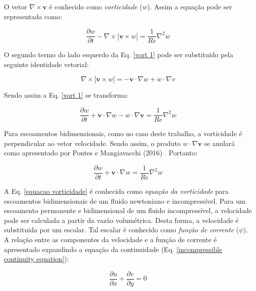 \medskip
O vetor $\nabla \times \textbf{v}$ é conhecido
como \textit{vorticidade} ($w$).
Assim a equação pode ser representada como:

\begin{equation} \label{vort 1}
 \frac{\partial w}{\partial t}
 - 
 \nabla \times \big[ \textbf{v} \times w \big]
 =
 \frac{1}{Re} \nabla^{2} w
\end{equation}

\medskip
O segundo termo do lado esquerdo da Eq. \ref{vort 1}
pode ser substituido pela seguinte identidade vetorial:


\begin{equation}
 \nabla \times \big[ \textbf{v} \times w \big]
 =
 -
 \textbf{v} \cdot \nabla w
 +
 w \cdot \nabla v
\end{equation}

\medskip
\noindent
Sendo assim a Eq. \ref{vort 1} se transforma:

\begin{equation} \label{vort 2}
 \frac{\partial w}{\partial t}
 +
 \textbf{v} \cdot \nabla w
 - 
 w \cdot \nabla \textbf{v}
 =
 \frac{1}{Re} \nabla^{2} w
\end{equation}

\medskip
Para escoamentos bidimensionais, como no caso deste trabalho, a vorticidade é perpendicular
ao vetor velocidade. Sendo assim, o produto $w \cdot \nabla \textbf{v}$
se anulará como apresentado por Pontes e Mangiavacchi (2016) \cite{pontes2016}. Portanto:

\begin{equation} \label{equacao vorticidade}
 \frac{\partial w}{\partial t}
 +
 \textbf{v} \cdot \nabla w
 =
 \frac{1}{Re} \nabla^{2} w
\end{equation}

\medskip
A Eq. \ref{equacao vorticidade} é conhecida como
\textit{equação da vorticidade} para escoamentos
bidimensionais de um fluido newtoniano
e incompressível. Para um escoamento permanente e bidimensional
de um fluido incompressível,
a velocidade pode ser calculada a partir da vazão volumétrica.
Desta forma, a velocidade é substituida por um escalar.
Tal escalar é conhecido como \textit{função de corrente}
($\psi$). 
A relação entre as componentes da velocidade e
a função de corrente é apresentado
expandindo a equação da continuidade
(Eq. \ref{incompressible continuity equation}):

\begin{equation} \label{cor 1}
 \frac{\partial u}{\partial x}
 +
 \frac{\partial v}{\partial y}
 =
 0
\end{equation}
 
